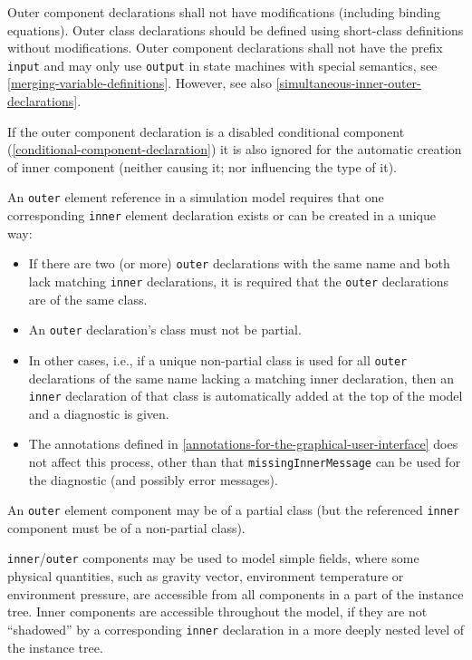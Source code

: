 Outer component declarations shall not have modifications (including binding equations).
Outer class declarations should be defined using short-class definitions without modifications.
Outer component declarations shall not have the prefix \lstinline!input! and may only use \lstinline!output! in state machines with special semantics, see \cref{merging-variable-definitions}.
However, see also \cref{simultaneous-inner-outer-declarations}.

If the outer component declaration is a disabled conditional component (\cref{conditional-component-declaration}) it is also ignored for the automatic creation of inner component (neither causing it; nor influencing the type of it).

An \lstinline!outer! element reference in a simulation model requires that one corresponding \lstinline!inner! element declaration exists or can be created in a unique way:
\begin{itemize}
\item
  If there are two (or more) \lstinline!outer! declarations with the same name and both lack matching \lstinline!inner! declarations, it is required that the \lstinline!outer! declarations are of the same class.
\item
  An \lstinline!outer! declaration's class must not be partial.
\item
  In other cases, i.e., if a unique non-partial class is used for all \lstinline!outer! declarations of the same name lacking a matching inner declaration, then an \lstinline!inner! declaration of that class is automatically added at the top of the model and a diagnostic is given.
\item
  The annotations defined in \cref{annotations-for-the-graphical-user-interface} does not affect this process, other than that \lstinline!missingInnerMessage! can be used for the diagnostic (and possibly error messages).
\end{itemize}

An \lstinline!outer! element component may be of a partial class (but the referenced \lstinline!inner! component must be of a non-partial class).

\begin{nonnormative}
\lstinline!inner!/\lstinline!outer! components may be used to model simple fields, where some physical quantities, such as gravity vector, environment temperature or environment pressure, are accessible from all components in a part of the instance tree.
Inner components are accessible throughout the model, if they are not ``shadowed'' by a corresponding \lstinline!inner! declaration in a more deeply nested level of the instance tree.
\end{nonnormative}

